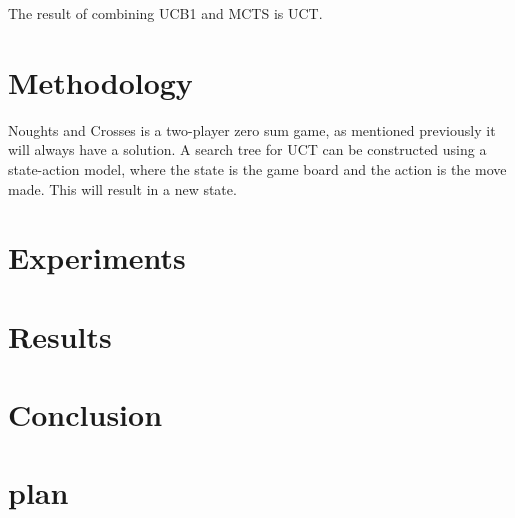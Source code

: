 The result of combining UCB1 and MCTS is UCT.

\section{Methodology}
Noughts and Crosses is a two-player zero sum game, as mentioned previously it will always have a solution. A search tree for UCT can be constructed using a state-action model, where the state is the game board and the action is the move made. This will result in a new state. 

\section{Experiments}
\section{Results}
\section{Conclusion}
\section{plan}


